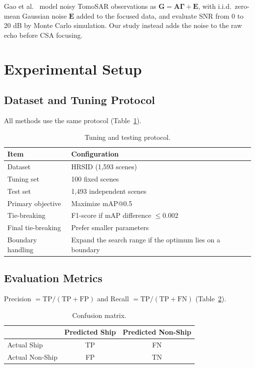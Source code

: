 \documentclass[11pt,a4paper]{article}
\theoremstyle{definition}
\begin{document}
Gao et al.~\cite{gao2024} model noisy TomoSAR observations as $\mathbf G = \mathbf A\boldsymbol\Gamma + \mathbf E$, with
i.i.d.\ zero-mean Gaussian noise $\mathbf E$ added to the focused data, and evaluate SNR from 0 to 20 dB
by Monte Carlo simulation. Our study instead adds the noise to the raw echo before CSA focusing.

\section{Experimental Setup}

\subsection{Dataset and Tuning Protocol}

All methods use the same protocol (Table~\ref{tab:protocol}).

\begin{table}[H]
\centering
\caption{Tuning and testing protocol.}\label{tab:protocol}
\begin{tabular}{|l|l|}
\hline
Item & Configuration \\
\hline
Dataset & HRSID (1,593 scenes) \\
\hline
Tuning set & 100 fixed scenes \\
\hline
Test set & 1,493 independent scenes \\
\hline
Primary objective & Maximize mAP@0.5 \\
\hline
Tie-breaking & F1-score if mAP difference $\le 0.002$ \\
\hline
Final tie-breaking & Prefer smaller parameters \\
\hline
Boundary handling & Expand the search range if the optimum lies on a boundary \\
\hline
\end{tabular}
\end{table}

\subsection{Evaluation Metrics}

Precision $=\mathrm{TP}/(\mathrm{TP}+\mathrm{FP})$ and Recall $=\mathrm{TP}/(\mathrm{TP}+\mathrm{FN})$ (Table~\ref{tab:confusion}).

\begin{table}[H]
\centering
\caption{Confusion matrix.}\label{tab:confusion}
\begin{tabular}{|l|c|c|}
\hline
 & Predicted Ship & Predicted Non-Ship \\
\hline
Actual Ship & TP & FN \\
\hline
Actual Non-Ship & FP & TN \\
\hline
\end{tabular}
\end{table}
\end{document}
